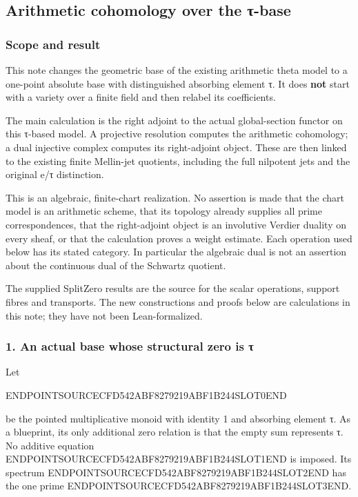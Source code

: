 \subsection{Arithmetic cohomology over the τ-base}\label{endpoint-tau_base--arithmetic-cohomology-over-the-ux3c4-base}

\subsubsection{Scope and result}\label{endpoint-tau_base--scope-and-result}

This note changes the geometric base of the existing arithmetic theta model to a one-point absolute base with distinguished absorbing element τ. It does \textbf{not} start with a variety over a finite field and then relabel its coefficients.

The main calculation is the right adjoint to the actual global-section functor on this τ-based model. A projective resolution computes the arithmetic cohomology; a dual injective complex computes its right-adjoint object. These are then linked to the existing finite Mellin-jet quotients, including the full nilpotent jets and the original e/τ distinction.

This is an algebraic, finite-chart realization. No assertion is made that the chart model is an arithmetic scheme, that its topology already supplies all prime correspondences, that the right-adjoint object is an involutive Verdier duality on every sheaf, or that the calculation proves a weight estimate. Each operation used below has its stated category. In particular the algebraic dual is not an assertion about the continuous dual of the Schwartz quotient.

The supplied SplitZero results are the source for the scalar operations, support fibres and transports. The new constructions and proofs below are calculations in this note; they have not been Lean-formalized.

\subsubsection{1. An actual base whose structural zero is τ}\label{endpoint-tau_base--an-actual-base-whose-structural-zero-is-ux3c4}

Let

ENDPOINTSOURCECFD542ABF8279219ABF1B244SLOT0END

be the pointed multiplicative monoid with identity 1 and absorbing element τ. As a blueprint, its only additional zero relation is that the empty sum represents τ. No additive equation ENDPOINTSOURCECFD542ABF8279219ABF1B244SLOT1END is imposed. Its spectrum ENDPOINTSOURCECFD542ABF8279219ABF1B244SLOT2END has the one prime ENDPOINTSOURCECFD542ABF8279219ABF1B244SLOT3END.

